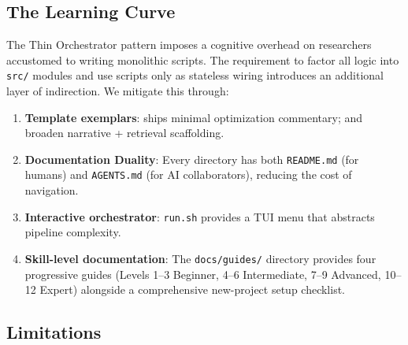 \documentclass[
]{article}
\providecommand{\tightlist}{%
  \setlength{\itemsep}{0pt}\setlength{\parskip}{0pt}}
\begin{document}
\subsection{The Learning Curve}\label{the-learning-curve}

The Thin Orchestrator pattern imposes a cognitive overhead on
researchers accustomed to writing monolithic scripts. The requirement to
factor all logic into \texttt{src/} modules and use scripts only as
stateless wiring introduces an additional layer of indirection. We
mitigate this through:

\begin{enumerate}
\def\labelenumi{\arabic{enumi}.}
\tightlist
\item
  \textbf{Template exemplars}:  ships
  minimal optimization commentary;  and
   broaden narrative + retrieval
  scaffolding.
\item
  \textbf{Documentation Duality}: Every directory has both
  \texttt{README.md} (for humans) and \texttt{AGENTS.md} (for AI
  collaborators), reducing the cost of navigation.
\item
  \textbf{Interactive orchestrator}: \texttt{run.sh} provides a TUI menu
  that abstracts pipeline complexity.
\item
  \textbf{Skill-level documentation}: The \texttt{docs/guides/}
  directory provides four progressive guides (Levels 1--3 Beginner, 4--6
  Intermediate, 7--9 Advanced, 10--12 Expert) alongside a comprehensive
  new-project setup checklist.
\end{enumerate}

\subsection{Limitations}\label{limitations}
\end{document}
